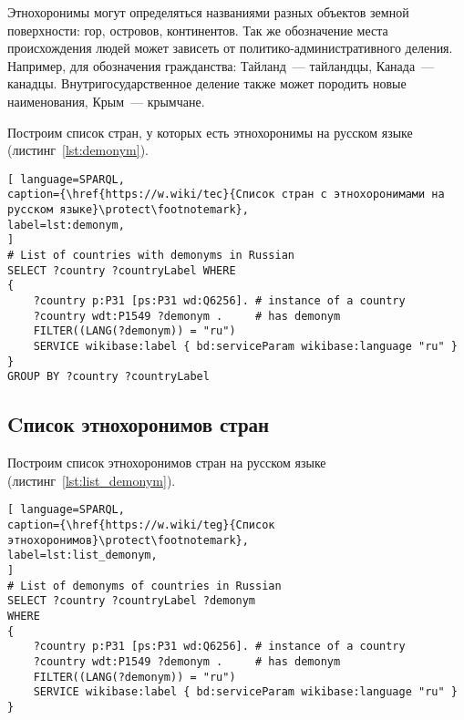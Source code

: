 Этнохоронимы могут определяться названиями разных объектов земной поверхности: гор, островов, континентов. Так же обозначение места происхождения людей может зависеть от политико-административного деления. Например, для обозначения гражданства: Тайланд~--- тайландцы, Канада~--- канадцы. Внутригосударственное деление также может породить новые наименования, Крым~--- крымчане.



\newpage
Построим список стран, у которых есть этнохоронимы на русском языке (листинг~\ref{lst:demonym}).


\begin{lstlisting}[ language=SPARQL, 
caption={\href{https://w.wiki/tec}{Список стран с этнохоронимами на русском языке}\protect\footnotemark},
label=lst:demonym, 
]
# List of countries with demonyms in Russian
SELECT ?country ?countryLabel WHERE
{
	?country p:P31 [ps:P31 wd:Q6256]. # instance of a country
	?country wdt:P1549 ?demonym .     # has demonym
	FILTER((LANG(?demonym)) = "ru")
	SERVICE wikibase:label { bd:serviceParam wikibase:language "ru" }
}
GROUP BY ?country ?countryLabel
\end{lstlisting}





\subsection{Cписок этнохоронимов стран}


Построим список этнохоронимов стран на русском языке (листинг~\ref{lst:list_demonym}).

\begin{lstlisting}[ language=SPARQL, 
caption={\href{https://w.wiki/teg}{Cписок этнохоронимов}\protect\footnotemark},
label=lst:list_demonym, 
]
# List of demonyms of countries in Russian
SELECT ?country ?countryLabel ?demonym
WHERE
{
	?country p:P31 [ps:P31 wd:Q6256]. # instance of a country
	?country wdt:P1549 ?demonym .     # has demonym
	FILTER((LANG(?demonym)) = "ru")
	SERVICE wikibase:label { bd:serviceParam wikibase:language "ru" }
}
\end{lstlisting}

